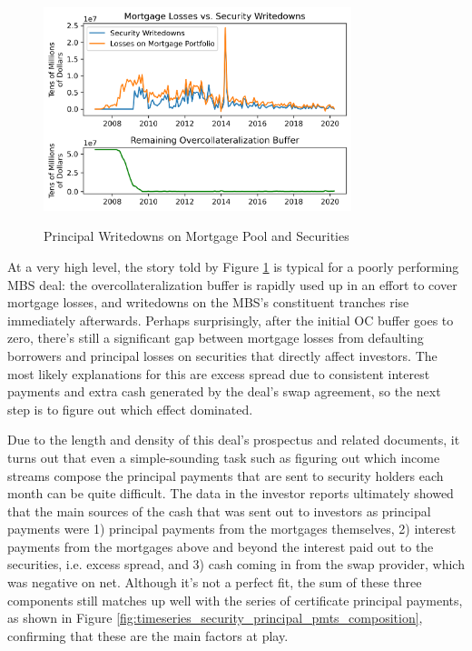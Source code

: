 \documentclass[12pt]{article}
\begin{document}
\begin{figure}[h]
	\centering
	\caption{Principal Writedowns on Mortgage Pool and Securities}
	\includegraphics[width=0.8\textwidth]{../figures/timeseries_losses_vs_writedowns}
	\label{fig:timeseries_losses_vs_writedowns}
\end{figure}

At a very high level, the story told by Figure \ref{fig:timeseries_losses_vs_writedowns} is typical for a poorly performing MBS deal: the overcollateralization buffer is rapidly used up in an effort to cover mortgage losses, and writedowns on the MBS’s constituent tranches rise immediately afterwards. Perhaps surprisingly, after the initial OC buffer goes to zero, there’s still a significant gap between mortgage losses from defaulting borrowers and principal losses on securities that directly affect investors. The most likely explanations for this are excess spread due to consistent interest payments and extra cash generated by the deal’s swap agreement, so the next step is to figure out which effect dominated.

	Due to the length and density of this deal's prospectus and related documents, it turns out that even a simple-sounding task such as figuring out which income streams compose the principal payments that are sent to security holders each month can be quite difficult. The data in the investor reports ultimately showed that the main sources of the cash that was sent out to investors as principal payments were 1) principal payments from the mortgages themselves, 2) interest payments from the mortgages above and beyond the interest paid out to the securities, i.e. excess spread, and 3) cash coming in from the swap provider, which was negative on net. Although it’s not a perfect fit, the sum of these three components still matches up well with the series of certificate principal payments, as shown in Figure \ref{fig:timeseries_security_principal_pmts_composition}, confirming that these are the main factors at play.
\end{document}
